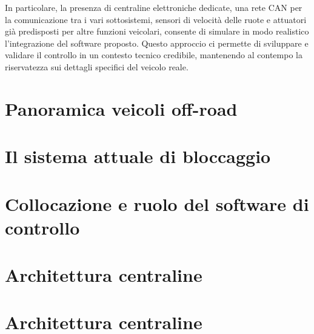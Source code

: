 \documentclass[11pt]{report}
\begin{document}
	In particolare, la presenza di centraline elettroniche dedicate, una rete CAN per la comunicazione tra i vari sottosistemi, sensori di velocità delle ruote e attuatori già predisposti per altre funzioni veicolari, consente di simulare in modo realistico l’integrazione del software proposto. Questo approccio ci permette di sviluppare e validare il controllo in un contesto tecnico credibile, mantenendo al contempo la riservatezza sui dettagli specifici del veicolo reale.
	
	
	
	
	
	
	\section{Panoramica veicoli off-road }
	\section{Il sistema attuale di bloccaggio}
	\section{Collocazione e ruolo del software di controllo}
	\section{Architettura centraline}
	\section{Architettura centraline}
	

	
\end{document}
